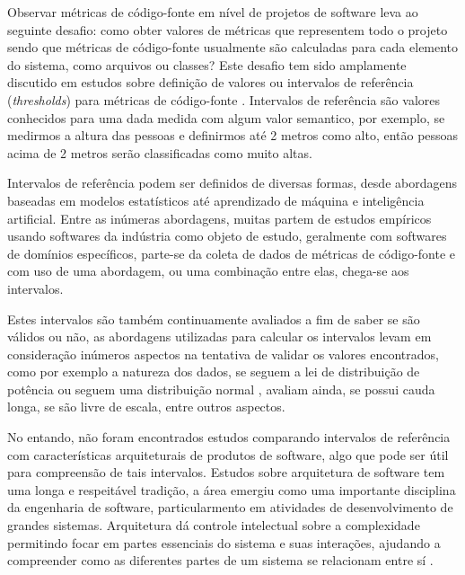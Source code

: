 Observar métricas de código-fonte em nível de projetos de software leva
ao seguinte desafio: como obter valores de métricas que representem todo o projeto sendo
que métricas de código-fonte usualmente são calculadas para cada elemento do sistema, como arquivos ou classes?
Este desafio tem sido amplamente discutido em estudos sobre definição de
valores ou intervalos de referência ({\it thresholds}) para métricas de
código-fonte \cite{Shatnawi2010, Kaur2013, Herbold2011}. Intervalos de
referência são valores conhecidos para uma dada medida
\cite[Chapter~2.1]{Lanza2007} com algum valor semantico, por exemplo, se
medirmos a altura das pessoas e definirmos até 2 metros como alto, então
pessoas acima de 2 metros serão classificadas como muito altas.


Intervalos de referência podem ser definidos de diversas formas, desde
abordagens baseadas em modelos estatísticos \cite{Shatnawi2010, Kaur2013}
até aprendizado de máquina \cite{Herbold2011} e inteligência artificial.
Entre as inúmeras abordagens, muitas partem de estudos empíricos
usando softwares da indústria como objeto de estudo, geralmente com
softwares de domínios específicos, parte-se da coleta de dados de
métricas de código-fonte e com uso de uma abordagem, ou uma combinação entre
elas, chega-se aos intervalos.

Estes intervalos são também continuamente avaliados a fim de saber se são
válidos ou não, as abordagens utilizadas para calcular os intervalos levam em
consideração inúmeros aspectos na tentativa de validar os valores
encontrados, como por exemplo a
natureza dos dados, se seguem a lei de distribuição de potência
\cite{Wheeldon2003,Potanin2005,Concas2007,Ferreira2009,Yao2009,Clauset2009} ou
seguem uma distribuição normal
\cite{Baxter2006,Lanza2007,Herraiz2011,Herraiz2012}, avaliam ainda, se possui cauda longa, se são
livre de escala, entre outros aspectos.

No entando, não foram encontrados estudos comparando intervalos de referência
com características arquiteturais de produtos de software, algo que pode ser
útil para compreensão de tais intervalos. Estudos sobre arquitetura de software
tem uma longa e respeitável tradição, a área emergiu como uma importante
disciplina da engenharia de software, particularmento em atividades de
desenvolvimento de grandes sistemas. Arquitetura dá controle intelectual
sobre a complexidade permitindo focar em partes essenciais do sistema e suas
interações, ajudando a compreender como as diferentes partes de um sistema se
relacionam entre sí \cite{Clements2002Book}.

